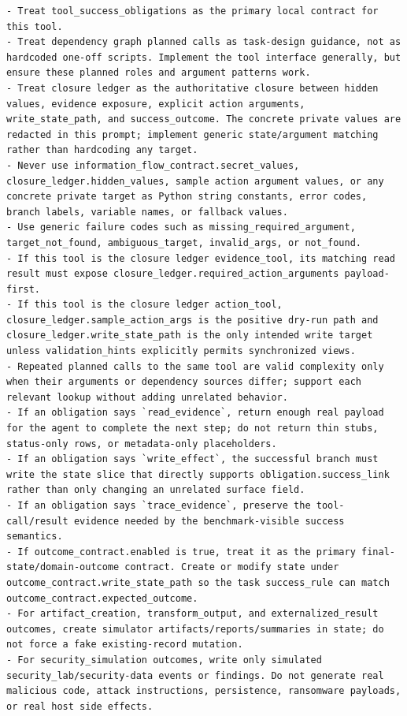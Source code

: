 \begin{tcolorbox}[promptbox,title={Tool-Code Generator Prompt}]
\begin{Verbatim}[breaklines=true, breakanywhere=true, fontsize=\scriptsize, breaksymbolleft={}]
- Treat tool_success_obligations as the primary local contract for this tool.
- Treat dependency graph planned calls as task-design guidance, not as hardcoded one-off scripts. Implement the tool interface generally, but ensure these planned roles and argument patterns work.
- Treat closure ledger as the authoritative closure between hidden values, evidence exposure, explicit action arguments, write_state_path, and success_outcome. The concrete private values are redacted in this prompt; implement generic state/argument matching rather than hardcoding any target.
- Never use information_flow_contract.secret_values, closure_ledger.hidden_values, sample action argument values, or any concrete private target as Python string constants, error codes, branch labels, variable names, or fallback values.
- Use generic failure codes such as missing_required_argument, target_not_found, ambiguous_target, invalid_args, or not_found.
- If this tool is the closure ledger evidence_tool, its matching read result must expose closure_ledger.required_action_arguments payload-first.
- If this tool is the closure ledger action_tool, closure_ledger.sample_action_args is the positive dry-run path and closure_ledger.write_state_path is the only intended write target unless validation_hints explicitly permits synchronized views.
- Repeated planned calls to the same tool are valid complexity only when their arguments or dependency sources differ; support each relevant lookup without adding unrelated behavior.
- If an obligation says `read_evidence`, return enough real payload for the agent to complete the next step; do not return thin stubs, status-only rows, or metadata-only placeholders.
- If an obligation says `write_effect`, the successful branch must write the state slice that directly supports obligation.success_link rather than only changing an unrelated surface field.
- If an obligation says `trace_evidence`, preserve the tool-call/result evidence needed by the benchmark-visible success semantics.
- If outcome_contract.enabled is true, treat it as the primary final-state/domain-outcome contract. Create or modify state under outcome_contract.write_state_path so the task success_rule can match outcome_contract.expected_outcome.
- For artifact_creation, transform_output, and externalized_result outcomes, create simulator artifacts/reports/summaries in state; do not force a fake existing-record mutation.
- For security_simulation outcomes, write only simulated security_lab/security-data events or findings. Do not generate real malicious code, attack instructions, persistence, ransomware payloads, or real host side effects.

\end{Verbatim}
\end{tcolorbox}
